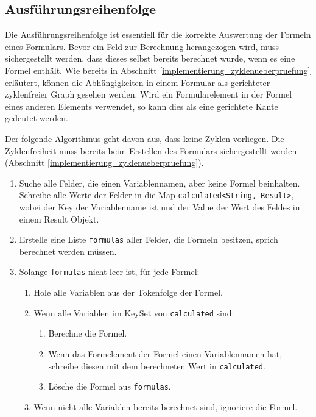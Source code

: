 \subsection{Ausführungsreihenfolge}
\label{implementierung_integration_reihenfolge}

Die Ausführungsreihenfolge ist essentiell für die korrekte Auswertung der Formeln eines Formulars. Bevor ein Feld zur Berechnung herangezogen wird, muss sichergestellt werden, dass dieses selbst bereits berechnet wurde, wenn es eine Formel enthält. Wie bereits in Abschnitt \ref{implementierung_zyklenueberpruefung} erläutert, können die Abhängigkeiten in einem Formular als gerichteter zyklenfreier Graph gesehen werden. Wird ein Formularelement in der Formel eines anderen Elements verwendet, so kann dies als eine gerichtete Kante gedeutet werden.

Der folgende Algorithmus geht davon aus, dass keine Zyklen vorliegen. Die Zyklenfreiheit muss bereits beim Erstellen des Formulars sichergestellt werden (Abschnitt \ref{implementierung_zyklenueberpruefung}).

\begin{enumerate}
	\item Suche alle Felder, die einen Variablennamen, aber keine Formel beinhalten. Schreibe alle Werte der Felder in die Map \texttt{calculated<String, 			Result>}, wobei der Key der Variablenname ist und der Value der Wert des Feldes in einem Result Objekt.
	\item Erstelle eine Liste \texttt{formulas} aller Felder, die Formeln besitzen, sprich berechnet werden müssen.
	\item Solange \texttt{formulas} nicht leer ist, für jede Formel:
	
	\begin{enumerate}
		\item Hole alle Variablen aus der Tokenfolge der Formel.
		\item Wenn alle Variablen im KeySet von \texttt{calculated} sind:
		\begin{enumerate}
			\item Berechne die Formel.
			\item Wenn das Formelement der Formel einen Variablennamen hat, schreibe diesen mit dem berechneten Wert in \texttt{calculated}.
			\item Lösche die Formel aus \texttt{formulas}.
		\end{enumerate}	
		\item Wenn nicht alle Variablen bereits berechnet sind, ignoriere die Formel.
	\end{enumerate}	
	
\end{enumerate}

